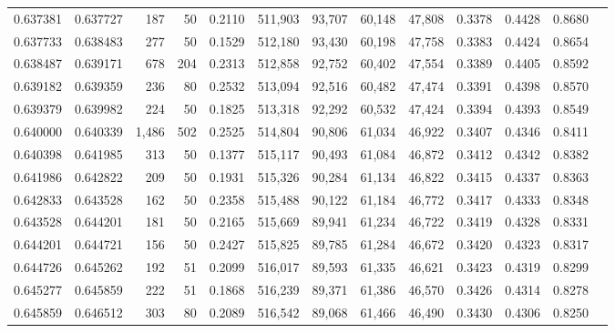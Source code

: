 \begin{tabular}{rrrrrrrrrrrrr}
0.637381 & 0.637727 &   187 &  50 &                                     0.2110 & 511,903 &  93,707 &  60,148 &  47,808 & 0.3378 & 0.4428 & 0.8680 \\
0.637733 & 0.638483 &   277 &  50 &                                     0.1529 & 512,180 &  93,430 &  60,198 &  47,758 & 0.3383 & 0.4424 & 0.8654 \\
0.638487 & 0.639171 &   678 & 204 &                                     0.2313 & 512,858 &  92,752 &  60,402 &  47,554 & 0.3389 & 0.4405 & 0.8592 \\
0.639182 & 0.639359 &   236 &  80 &                                     0.2532 & 513,094 &  92,516 &  60,482 &  47,474 & 0.3391 & 0.4398 & 0.8570 \\
0.639379 & 0.639982 &   224 &  50 &                                     0.1825 & 513,318 &  92,292 &  60,532 &  47,424 & 0.3394 & 0.4393 & 0.8549 \\
0.640000 & 0.640339 & 1,486 & 502 &                                     0.2525 & 514,804 &  90,806 &  61,034 &  46,922 & 0.3407 & 0.4346 & 0.8411 \\
0.640398 & 0.641985 &   313 &  50 &                                     0.1377 & 515,117 &  90,493 &  61,084 &  46,872 & 0.3412 & 0.4342 & 0.8382 \\
0.641986 & 0.642822 &   209 &  50 &                                     0.1931 & 515,326 &  90,284 &  61,134 &  46,822 & 0.3415 & 0.4337 & 0.8363 \\
0.642833 & 0.643528 &   162 &  50 &                                     0.2358 & 515,488 &  90,122 &  61,184 &  46,772 & 0.3417 & 0.4333 & 0.8348 \\
0.643528 & 0.644201 &   181 &  50 &                                     0.2165 & 515,669 &  89,941 &  61,234 &  46,722 & 0.3419 & 0.4328 & 0.8331 \\
0.644201 & 0.644721 &   156 &  50 &                                     0.2427 & 515,825 &  89,785 &  61,284 &  46,672 & 0.3420 & 0.4323 & 0.8317 \\
0.644726 & 0.645262 &   192 &  51 &                                     0.2099 & 516,017 &  89,593 &  61,335 &  46,621 & 0.3423 & 0.4319 & 0.8299 \\
0.645277 & 0.645859 &   222 &  51 &                                     0.1868 & 516,239 &  89,371 &  61,386 &  46,570 & 0.3426 & 0.4314 & 0.8278 \\
0.645859 & 0.646512 &   303 &  80 &                                     0.2089 & 516,542 &  89,068 &  61,466 &  46,490 & 0.3430 & 0.4306 & 0.8250 \\

\end{tabular}
